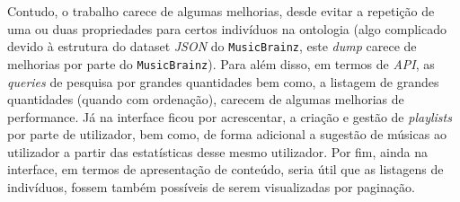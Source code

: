 \documentclass{article}
\begin{document}
Contudo, o trabalho carece de algumas melhorias, desde evitar a repetição de uma ou duas propriedades para certos indivíduos na ontologia (algo complicado devido à estrutura do dataset \textit{JSON} do \texttt{MusicBrainz}, este \textit{dump} carece de melhorias por parte do \texttt{MusicBrainz}). Para além disso, em termos de \textit{API}, as \textit{queries} de pesquisa por grandes quantidades bem como, a listagem de grandes quantidades (quando com ordenação), carecem de algumas melhorias de performance. Já na interface ficou por acrescentar, a criação e gestão de \textit{playlists} por parte de utilizador, bem como, de forma adicional a sugestão de músicas ao utilizador a partir das estatísticas desse mesmo utilizador. Por fim, ainda na interface, em termos de apresentação de conteúdo, seria útil que as listagens de indivíduos, fossem também possíveis de serem visualizadas por paginação.

\newpage 
\printbibliography

\begin{appendices}

\end{appendices}
\end{document}
